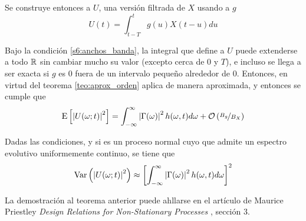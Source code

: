 Se construye entonces a $U$, una versión filtrada de $X$ usando a $g$
\begin{equation}
U(t) = \int_{t-T}^{t} g(u) X(t-u) du
\end{equation}

Bajo la condición \ref{s6:anchos_banda}, la integral que define a $U$ puede extenderse a todo $\mathbb{R}$ sin cambiar mucho su valor (excepto cerca de 0 y $T$), e incluso se llega a ser exacta si $g$ es 0 fuera de un intervalo pequeño alrededor de 0. Entonces, en virtud del teorema \ref{teo:aprox_orden}
aplica de manera aproximada, y entonces se cumple que
\begin{equation}
\mathrm{E}\left[ \left| U(\omega; t) \right|^{2} \right] = \int_{-\infty}^{\infty} \left| \Gamma(\omega) \right|^{2} h(\omega, t)d\omega + \mathcal{O}\left( \nicefrac{B_g}{B_X} \right)
\end{equation}


\begin{proposicion}
Dadas las condiciones, y si \xt es un proceso normal cuyo que admite un espectro evolutivo uniformemente continuo, se tiene que
\begin{equation}
\mathrm{Var}\left( \left| U(\omega;t) \right|^{2} \right) \approx \left[ \int_{-\infty}^{\infty} \left| \Gamma(\omega) \right|^{2} h(\omega, t)d\omega \right]^{2}
\end{equation}
\end{proposicion}

La demostración al teorema anterior puede ahllarse en el artículo de Maurice Priestley \textit{Design Relations for Non-Stationary Processes} \cite{Priestley66}, sección 3.

